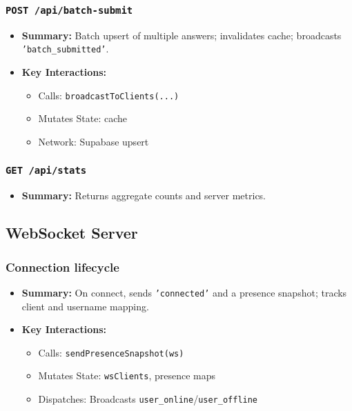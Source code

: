 \documentclass[11pt,letterpaper]{article}
\begin{document}
\subsubsection{\texttt{POST /api/batch-submit}}
\begin{itemize}
    \item \textbf{Summary:} Batch upsert of multiple answers; invalidates cache; broadcasts \texttt{'batch\_submitted'}.
    \item \textbf{Key Interactions:}
    \begin{itemize}
        \item Calls: \texttt{broadcastToClients(...)}
        \item Mutates State: cache
        \item Network: Supabase upsert
    \end{itemize}
\end{itemize}

\subsubsection{\texttt{GET /api/stats}}
\begin{itemize}
    \item \textbf{Summary:} Returns aggregate counts and server metrics.
\end{itemize}

\subsection{WebSocket Server}

\subsubsection{Connection lifecycle}
\begin{itemize}
    \item \textbf{Summary:} On connect, sends \texttt{'connected'} and a presence snapshot; tracks client and username mapping.
    \item \textbf{Key Interactions:}
    \begin{itemize}
        \item Calls: \texttt{sendPresenceSnapshot(ws)}
        \item Mutates State: \texttt{wsClients}, presence maps
        \item Dispatches: Broadcasts \texttt{user\_online}/\texttt{user\_offline}
    \end{itemize}
\end{itemize}
\end{document}
